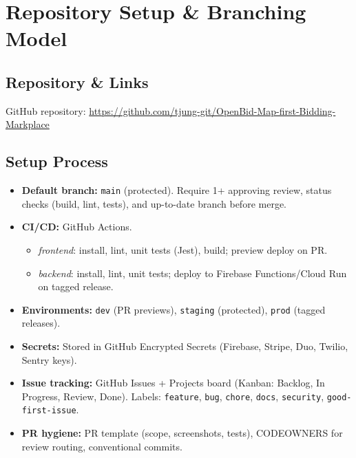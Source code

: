 \documentclass[11pt]{article}
\newcommand{\repoURL}{https://github.com/tjung-git/OpenBid-Map-first-Bidding-Markplace}
\begin{document}
\section{Repository Setup \& Branching Model}

\subsection*{Repository \& Links}
GitHub repository: \href{\repoURL}{\repoURL}

\subsection*{Setup Process}
\begin{itemize}[leftmargin=1.4em]
  \item \textbf{Default branch:} \texttt{main} (protected). Require 1+ approving review, status checks (build, lint, tests), and up-to-date branch before merge.
  \item \textbf{CI/CD:} GitHub Actions.
    \begin{itemize}
      \item \emph{frontend}: install, lint, unit tests (Jest), build; preview deploy on PR.
      \item \emph{backend}: install, lint, unit tests; deploy to Firebase Functions/Cloud Run on tagged release.
    \end{itemize}
  \item \textbf{Environments:} \texttt{dev} (PR previews), \texttt{staging} (protected), \texttt{prod} (tagged releases).
  \item \textbf{Secrets:} Stored in GitHub Encrypted Secrets (Firebase, Stripe, Duo, Twilio, Sentry keys).
  \item \textbf{Issue tracking:} GitHub Issues + Projects board (Kanban: Backlog, In Progress, Review, Done). Labels: \texttt{feature}, \texttt{bug}, \texttt{chore}, \texttt{docs}, \texttt{security}, \texttt{good-first-issue}.
  \item \textbf{PR hygiene:} PR template (scope, screenshots, tests), CODEOWNERS for review routing, conventional commits.
\end{itemize}
\end{document}
